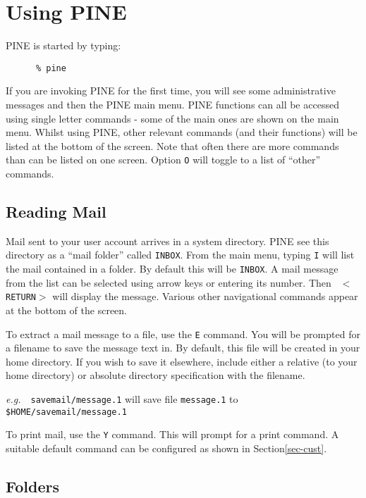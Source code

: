 \section{Using PINE}

PINE is started by typing:

\begin{verbatim}
      % pine
\end{verbatim}

If you are invoking PINE for the first time, you will see some
administrative messages and then the PINE main menu. PINE functions
can all be accessed using single letter commands - some of the main
ones are shown on the main menu. Whilst using PINE, other relevant commands
(and their functions) will be listed at the bottom of the screen.
Note that often there are more commands than can be listed on one screen.
Option {\tt O} will toggle to a list of ``other'' commands.

\subsection{Reading Mail}

Mail sent to your user account arrives in a system directory. PINE
see this directory as a ``mail folder'' called {\tt INBOX}. From the
main menu, typing {\tt I} will list the mail contained in a folder.
By default this will be {\tt INBOX}. A mail message from the list
can be selected using arrow keys or entering its number. Then {\tt
$<$RETURN$>$} will display the message. Various other navigational commands
appear at the bottom of the screen.

To extract a mail message to a file, use the {\tt E} command. You will be
prompted for a filename to save the message text in. By default, this
file will be created in your home directory. If you wish to save it
elsewhere, include either a relative (to your home directory)
or absolute directory specification with the filename.

{\em e.g.}~~{\tt savemail/message.1} will save file {\tt message.1} to 
{\tt \$HOME/savemail/message.1}

To print mail, use the {\tt Y} command. This will prompt for
a print command. A suitable default command can be configured as
shown in Section\ref{sec-cust}.

\subsection{Folders}

